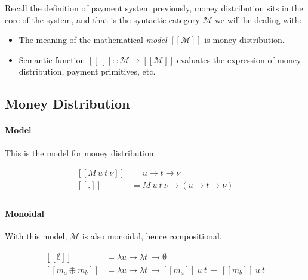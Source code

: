 Recall the definition of payment system previously, money distribution sits in the core of the
system, and that is the syntactic category $\mathcal{M}$ we will be dealing with:

\begin{itemize}
    \item The meaning of the mathematical \textit{model} $[\![\mathcal{M}]\!]$ is money distribution.

    \item Semantic function $[\![.]\!] :: \mathcal{M} \rightarrow [\![\mathcal{M}]\!] $ evaluates
the expression of money distribution, payment primitives, etc.
\end{itemize}

\subsection{Money Distribution}

\paragraph{Model}

This is the model for money distribution.

\begin{equation}\label{md_model}
    \begin{split}
        [\![M\ u\ t\ \nu]\!] &= u \rightarrow t \rightarrow \nu \\
        [\![.]\!] &= M\ u\ t\ \nu \rightarrow (u \rightarrow t \rightarrow \nu) \\
    \end{split}
\end{equation}

\paragraph{Monoidal}

With this model, $\mathcal{M}$ is also monoidal, hence compositional.

\begin{equation}
    \begin{split}
        [\![\emptyset]\!] &= \lambda u \rightarrow \lambda t\ \rightarrow \emptyset \\
        [\![m_a \oplus m_b]\!] &= \lambda u \rightarrow \lambda t\ \rightarrow
            [\![m_a]\!]\ u\ t\ +\ [\![m_b]\!]\ u\ t \\
    \end{split}
\end{equation}

